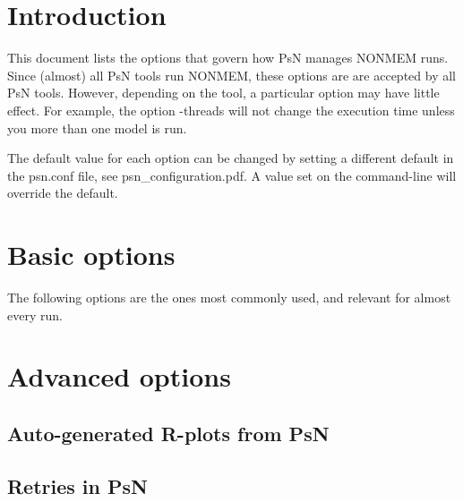 



\maketitle
\newcommand{\guidetoolname}{<toolname>}

\section{Introduction}
This document lists the options that govern how PsN manages NONMEM runs.
Since (almost) all PsN tools run NONMEM, these options are 
are accepted by all PsN tools. 
However, depending on the tool, a particular option may have little effect. 
For example, the option -threads will not change the execution time unless 
you more than one model is run. 

The default value for each option can be changed by setting a different default in the psn.conf file, see 
psn\_configuration.pdf. A value set on the command-line will override the default.

\section{Basic options}
The following options are the ones most commonly used, and relevant for almost every run.


\section{Advanced options}
\subsection{Auto-generated R-plots from PsN}
\newcommand{\rplotsconditions}{
Most default templates depend on a couple of R libraries. 
The R-scripts subdirectory contains, in addition to 
all the default templates,
a script required\_packages.R that can be run to install all the packages used
by one or more of the default templates.
If the required R libraries for a particular template are not installed then
no pdf will be generated. Check the .Rout file in the main run directory for error messages.
}


\subsection{Retries in PsN}



